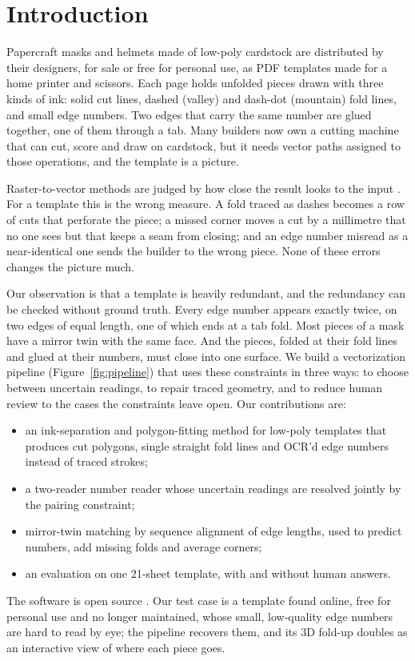 \section{Introduction}

Papercraft masks and helmets made of low-poly cardstock are distributed by their designers,
for sale or free for personal use, as PDF templates made for a home printer and scissors. Each
page holds unfolded pieces drawn with three kinds of ink: solid cut lines, dashed (valley) and
dash-dot (mountain) fold lines, and small edge numbers. Two edges that carry the same number
are glued together, one of them through a tab. Many builders now own a cutting machine that can
cut, score and draw on cardstock, but it needs vector paths assigned to those operations, and the
template is a picture.

Raster-to-vector methods are judged by how close the result looks to the input
\cite{selinger2003potrace,hilaire2006,noris2013,bessmeltsev2019,egiazarian2020}. For a template
this is the wrong measure. A fold traced as dashes becomes a row of cuts that perforate the piece;
a missed corner moves a cut by a millimetre that no one sees but that keeps a seam from
closing; and an edge number misread as a near-identical one sends the builder to the wrong piece.
None of these errors changes the picture much.

Our observation is that a template is heavily redundant, and the redundancy can be checked
without ground truth. Every edge number appears exactly twice, on two edges of equal length, one
of which ends at a tab fold. Most pieces of a mask have a mirror twin with the same face. And the
pieces, folded at their fold lines and glued at their numbers, must close into one surface. We
build a vectorization pipeline (Figure~\ref{fig:pipeline}) that uses these constraints in three
ways: to choose between uncertain readings, to repair traced geometry, and to reduce human
review to the cases the constraints leave open. Our contributions are:
\begin{itemize}\setlength\itemsep{0pt}
\item an ink-separation and polygon-fitting method for low-poly templates that produces cut
  polygons, single straight fold lines and OCR'd edge numbers instead of traced strokes;
\item a two-reader number reader whose uncertain readings are resolved jointly by the pairing
  constraint;
\item mirror-twin matching by sequence alignment of edge lengths, used to predict numbers, add
  missing folds and average corners;
\item an evaluation on one 21-sheet template, with and without human answers.
\end{itemize}
The software is open source \codelink. Our test case is a template found online, free for
personal use and no longer maintained, whose small, low-quality edge numbers are hard to read by eye;
the pipeline recovers them, and its 3D fold-up doubles as an interactive view of where each piece
goes.

